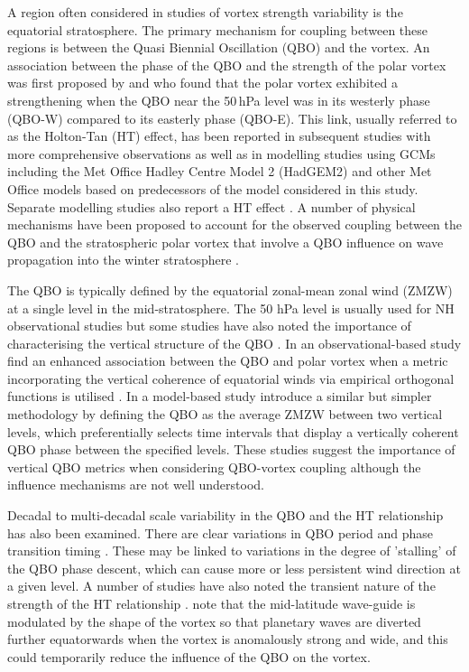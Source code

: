 \documentclass[wcd, manuscript]{copernicus}
\begin{document}
A region often considered in studies of vortex strength variability is the equatorial stratosphere. The primary mechanism for coupling between these regions is between the Quasi Biennial Oscillation (QBO) and the vortex. An association between the phase of the QBO and the strength of the polar vortex was first proposed by \cite{HoltonJamesRTan1980} and \cite{Holton1982} who found that the polar vortex exhibited a strengthening when the QBO near the 50\,hPa level was in its westerly phase (QBO-W) compared to its easterly phase (QBO-E). This link, usually referred to as the Holton-Tan (HT) effect, has been reported in subsequent studies with more comprehensive observations as well as in modelling studies using GCMs including the Met Office Hadley Centre Model 2 (HadGEM2) \citep{Watson2014} and other Met Office models \citep{Garfinkel2018} based on predecessors of the model considered in this study. Separate modelling studies also report a HT effect \citep{Baldwin1991,Pascoe2005,Lu2008}. A number of physical mechanisms have been proposed to account for the observed coupling between the QBO and the stratospheric polar vortex that involve a QBO influence on wave propagation into the winter stratosphere \citep{Baldwin2001}.  

The QBO is typically defined by the equatorial zonal-mean zonal wind (ZMZW) at a single level in the mid-stratosphere. The 50 hPa level is usually used for NH observational studies \citep{Baldwin2001, Baldwin98} but some studies have also noted the importance of characterising the vertical structure of the QBO \citep{Fraedrih1993, Wallace1993,  Baldwin98,  Dunkerton2017, Gray2018, Andrews2019}. In an observational-based study  \cite{Gray2018} find an enhanced association between the QBO and polar vortex when a metric incorporating the vertical coherence of equatorial winds via empirical orthogonal functions is utilised \citep{verena2016a}. In a model-based study \cite{Andrews2019} introduce a similar but simpler methodology by defining the QBO as the average ZMZW between two vertical levels, which preferentially selects time intervals that display a vertically coherent QBO phase between the specified levels. These studies suggest the importance of vertical QBO metrics when considering QBO-vortex coupling although the influence mechanisms are not well understood. 

Decadal to multi-decadal scale variability in the QBO and the HT relationship has also been examined. There are clear variations in QBO period and phase transition timing \citep{Pascoe2005,Anstey2008,Yang2016}. These may be linked to variations in the degree of 'stalling' of the QBO phase descent, which can cause more or less persistent wind direction at a given level.  A number of studies have also noted the transient nature of the strength of the HT relationship \citep{Lu2008,Lu14,Anstey2008,OspEA10}. \cite{Lu2008,Lu14} note that the mid-latitude wave-guide is modulated by the shape of the vortex so that planetary waves are diverted further equatorwards when the vortex is anomalously strong and wide, and this could temporarily reduce the influence of the QBO on the vortex. 
\end{document}
